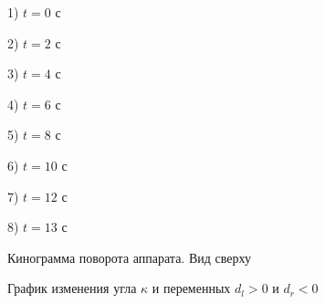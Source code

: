 \begin{figure}
\begin{minipage}[h]{0.4\linewidth}
 1) $t=0$ с\\
\end{minipage}
\begin{minipage}[h]{0.4\linewidth}
 2) $t=2$ с\\
\end{minipage}
\begin{minipage}[h]{0.4\linewidth}
 3) $t=4$ с\\
\end{minipage}
\begin{minipage}[h]{0.4\linewidth}
 4) $t=6$ с\\
\end{minipage}
\begin{minipage}[h]{0.4\linewidth}
 5) $t=8$ с\\
\end{minipage}
\begin{minipage}[h]{0.4\linewidth}
 6) $t=10$ с\\
\end{minipage}
\begin{minipage}[h]{0.4\linewidth}
 7) $t=12$ с\\
\end{minipage}
\hfill
\begin{minipage}[h]{0.4\linewidth}
 8) $t=13$ с\\
\end{minipage}
\caption{Кинограмма поворота аппарата. Вид сверху}
\label{ortho_kinogramma}
\end{figure}




\begin{figure}
\caption{График изменения угла $\kappa$ и переменных $d_l>0$ и $d_r<0$}
\end{figure}

